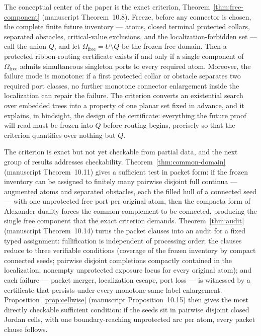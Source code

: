 \documentclass[11pt,reqno]{amsart}
\theoremstyle{definition}
\theoremstyle{remark}
\newcommand{\Omfree}{\Omega_{\mathrm{free}}}
\begin{document}
The conceptual center of the paper is the exact criterion,
Theorem~\ref{thm:free-component} (manuscript Theorem~10.8).  Freeze, before
any connector is chosen, the complete finite future inventory --- atoms,
closed terminal protected collars, separated obstacles, critical-value
exclusions, and the localization-forbidden set --- call the union $Q$, and
let $\Omfree=U\setminus Q$ be the frozen free domain.  Then a protected
ribbon-routing certificate exists if and only if a single component of
$\Omfree$ admits simultaneous singleton ports to every required atom.
Moreover, the failure mode is monotone: if a first protected collar or
obstacle separates two required port classes, no further monotone connector
enlargement inside the localization can repair the failure.  The criterion
converts an existential search over embedded trees into a property of one
planar set fixed in advance, and it explains, in hindsight, the design of
the certificate: everything the future proof will read must be frozen into
$Q$ before routing begins, precisely so that the criterion quantifies over
nothing but $Q$.

The criterion is exact but not yet checkable from partial data, and the next
group of results addresses checkability.  Theorem~\ref{thm:common-domain}
(manuscript Theorem~10.11) gives a sufficient test in packet form: if the
frozen inventory can be assigned to finitely many pairwise disjoint full
continua --- augmented atoms and separated obstacles, each the filled hull of
a connected seed --- with one unprotected free port per original atom, then
the compacta form of Alexander duality forces the common complement to be
connected, producing the single free component that the exact criterion
demands.  Theorem~\ref{thm:audit} (manuscript Theorem~10.14) turns the
packet clauses into an audit for a fixed typed assignment: fullification is
independent of processing order; the clauses reduce to three verifiable
conditions (coverage of the frozen inventory by compact connected seeds;
pairwise disjoint completions compactly contained in the localization;
nonempty unprotected exposure locus for every original atom); and each
failure --- packet merger, localization escape, port loss --- is witnessed
by a certificate that persists under every monotone same-label enlargement.
Proposition~\ref{prop:cellwise} (manuscript Proposition~10.15) then gives
the most directly checkable sufficient condition: if the seeds sit in
pairwise disjoint closed Jordan cells, with one boundary-reaching
unprotected arc per atom, every packet clause follows.
\end{document}
